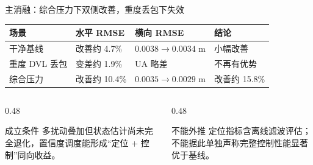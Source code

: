 \begin{frame}{主消融：综合压力下双侧改善，重度丢包下失效}
  \small
  \begin{table}
    \centering
    \begin{tabularx}{\linewidth}{l>{\centering\arraybackslash}X>{\centering\arraybackslash}X>{\centering\arraybackslash}X}
      \toprule
      场景 & 水平 RMSE & 横向 RMSE & 结论 \\
      \midrule
      干净基线
        & 改善约 4.7\%
        & \(0.0038\rightarrow0.0034\) m
        & 小幅改善 \\
      重度 DVL 丢包
        & \textcolor{DefenseRed}{变差约 1.9\%}
        & UA 略差
        & \textcolor{DefenseRed}{不再有优势} \\
      综合压力
        & \textcolor{DefenseGreen}{改善约 10.4\%}
        & \textcolor{DefenseGreen}{\(0.0035\rightarrow0.0029\) m}
        & \textcolor{DefenseGreen}{改善约 15.8\%} \\
      \bottomrule
    \end{tabularx}
  \end{table}

  \vspace{3mm}
  \begin{columns}[T,onlytextwidth]
    \begin{column}{0.48\textwidth}
      \begin{block}{成立条件}
        多扰动叠加但状态估计尚未完全退化，置信度调度能形成“定位 + 控制”同向收益。
      \end{block}
    \end{column}
    \begin{column}{0.48\textwidth}
      \begin{alertblock}{不能外推}
        定位指标含离线滤波评估；不能据此单独声称完整控制性能显著优于基线。
      \end{alertblock}
    \end{column}
  \end{columns}
\end{frame}
